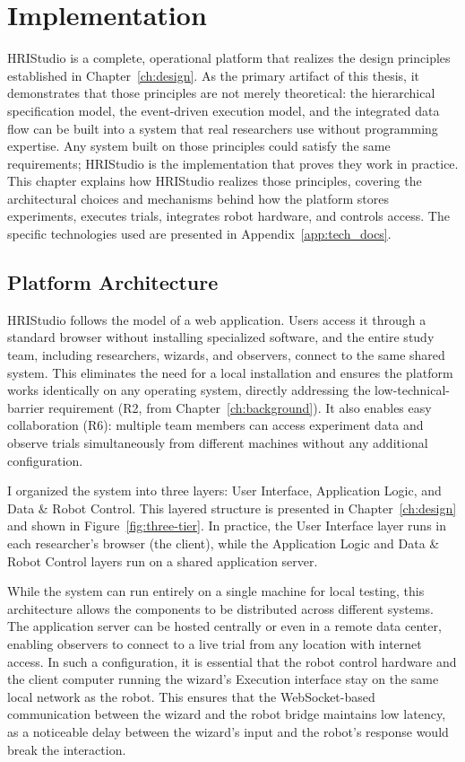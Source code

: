 \chapter{Implementation}
\label{ch:implementation}

HRIStudio is a complete, operational platform that realizes the design principles established in Chapter~\ref{ch:design}. As the primary artifact of this thesis, it demonstrates that those principles are not merely theoretical: the hierarchical specification model, the event-driven execution model, and the integrated data flow can be built into a system that real researchers use without programming expertise. Any system built on those principles could satisfy the same requirements; HRIStudio is the implementation that proves they work in practice. This chapter explains how HRIStudio realizes those principles, covering the architectural choices and mechanisms behind how the platform stores experiments, executes trials, integrates robot hardware, and controls access. The specific technologies used are presented in Appendix~\ref{app:tech_docs}.

\section{Platform Architecture}

HRIStudio follows the model of a web application. Users access it through a standard browser without installing specialized software, and the entire study team, including researchers, wizards, and observers, connect to the same shared system. This eliminates the need for a local installation and ensures the platform works identically on any operating system, directly addressing the low-technical-barrier requirement (R2, from Chapter~\ref{ch:background}). It also enables easy collaboration (R6): multiple team members can access experiment data and observe trials simultaneously from different machines without any additional configuration.

I organized the system into three layers: User Interface, Application Logic, and Data \& Robot Control. This layered structure is presented in Chapter~\ref{ch:design} and shown in Figure~\ref{fig:three-tier}. In practice, the User Interface layer runs in each researcher's browser (the client), while the Application Logic and Data \& Robot Control layers run on a shared application server. 

While the system can run entirely on a single machine for local testing, this architecture allows the components to be distributed across different systems. The application server can be hosted centrally or even in a remote data center, enabling observers to connect to a live trial from any location with internet access. In such a configuration, it is essential that the robot control hardware and the client computer running the wizard's Execution interface stay on the same local network as the robot. This ensures that the WebSocket-based communication between the wizard and the robot bridge maintains low latency, as a noticeable delay between the wizard's input and the robot's response would break the interaction.

